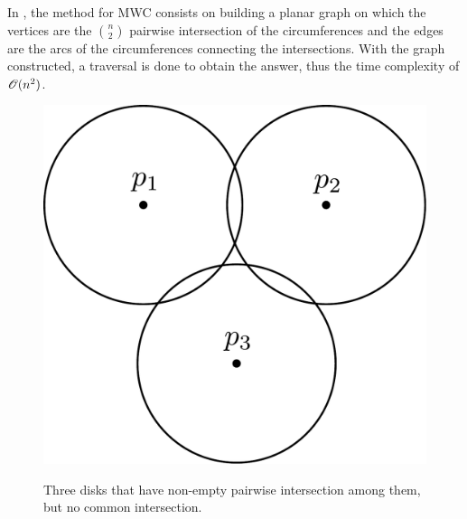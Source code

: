 In , the method for MWC consists on building a planar graph on which the vertices are the $\binom{n}{2}$ pairwise intersection of the circumferences and the edges are the arcs of the circumferences connecting the intersections. With the graph constructed, a traversal is done to obtain the answer, thus the time complexity of $\mathscr{O}(n^2)$.

\begin{figure}[H]
\centering

    \caption{Three disks that have non-empty pairwise intersection among them, but no common intersection.}

    
    
    
       
    \includegraphics[scale=.35]{tex/figures/three_disks_no_intersection.pdf}
    \label{fig:three_disks_no_intersection}
    \fautor
\end{figure}

